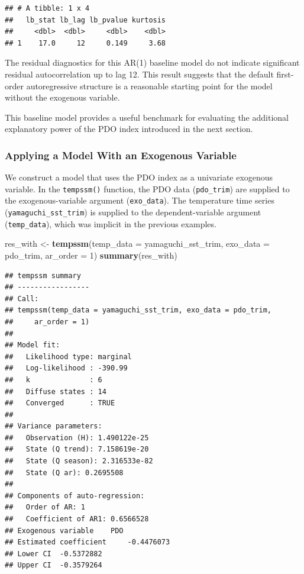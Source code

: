 \documentclass[
]{article}
\newenvironment{Shaded}{\begin{snugshade}}{\end{snugshade}}
\newcommand{\AttributeTok}[1]{\textcolor[rgb]{0.13,0.29,0.53}{#1}}
\newcommand{\DecValTok}[1]{\textcolor[rgb]{0.00,0.00,0.81}{#1}}
\newcommand{\FunctionTok}[1]{\textcolor[rgb]{0.13,0.29,0.53}{\textbf{#1}}}
\newcommand{\NormalTok}[1]{#1}
\newcommand{\OtherTok}[1]{\textcolor[rgb]{0.56,0.35,0.01}{#1}}
\begin{document}
\begin{verbatim}
## # A tibble: 1 x 4
##   lb_stat lb_lag lb_pvalue kurtosis
##     <dbl>  <dbl>     <dbl>    <dbl>
## 1    17.0     12     0.149     3.68
\end{verbatim}

The residual diagnostics for this AR(1) baseline model do not indicate
significant residual autocorrelation up to lag 12. This result suggests
that the default first-order autoregressive structure is a reasonable
starting point for the model without the exogenous variable.

This baseline model provides a useful benchmark for evaluating the
additional explanatory power of the PDO index introduced in the next
section.

\subsubsection{Applying a Model With an Exogenous
Variable}\label{applying-a-model-with-an-exogenous-variable}

We construct a model that uses the PDO index as a univariate exogenous
variable. In the \texttt{tempssm()} function, the PDO data
(\texttt{pdo\_trim}) are supplied to the exogenous-variable argument
(\texttt{exo\_data}). The temperature time series
(\texttt{yamaguchi\_sst\_trim}) is supplied to the dependent-variable
argument (\texttt{temp\_data}), which was implicit in the previous
examples.

\begin{Shaded}
\begin{Highlighting}[]
\NormalTok{res\_with }\OtherTok{\textless{}{-}} \FunctionTok{tempssm}\NormalTok{(}\AttributeTok{temp\_data =}\NormalTok{ yamaguchi\_sst\_trim,}
                    \AttributeTok{exo\_data =}\NormalTok{ pdo\_trim,}
                    \AttributeTok{ar\_order =} \DecValTok{1}\NormalTok{) }
\FunctionTok{summary}\NormalTok{(res\_with)}
\end{Highlighting}
\end{Shaded}

\begin{verbatim}
## tempssm summary
## -----------------
## Call:
## tempssm(temp_data = yamaguchi_sst_trim, exo_data = pdo_trim, 
##     ar_order = 1)
## 
## Model fit:
##   Likelihood type: marginal 
##   Log-likelihood : -390.99 
##   k              : 6 
##   Diffuse states : 14 
##   Converged      : TRUE 
## 
## Variance parameters:
##   Observation (H): 1.490122e-25 
##   State (Q trend): 7.158619e-20 
##   State (Q season): 2.316533e-82 
##   State (Q ar): 0.2695508 
## 
## Components of auto-regression:
##   Order of AR: 1 
##   Coefficient of AR1: 0.6566528 
## Exogenous variable    PDO 
## Estimated coefficient     -0.4476073 
## Lower CI  -0.5372882 
## Upper CI  -0.3579264
\end{verbatim}
\end{document}
